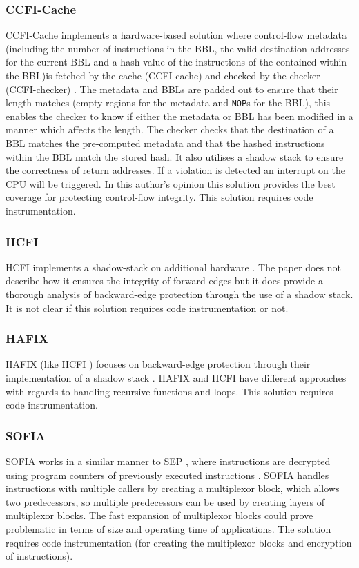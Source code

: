 \subsubsection*{CCFI-Cache}
CCFI-Cache implements a hardware-based solution where control-flow metadata (including the number of instructions in the BBL, the valid destination addresses for the current BBL and a hash value of the instructions of the contained within the BBL)is fetched by the cache (CCFI-cache) and checked by the checker (CCFI-checker) \cite{Danger2018}. The metadata and BBLs are padded out to ensure that their length matches (empty regions for the metadata and \verb|NOP|s for the BBL), this enables the checker to know if either the metadata or BBL has been modified in a manner which affects the length. The checker checks that the destination of a BBL matches the pre-computed metadata and that the hashed instructions within the BBL match the stored hash. It also utilises a shadow stack to ensure the correctness of return addresses. If a violation is detected an interrupt on the CPU will be triggered. In this author's opinion this solution provides the best coverage for protecting control-flow integrity. This solution requires code instrumentation.

\subsubsection*{HCFI}
HCFI implements a shadow-stack on additional hardware \cite{Danger2018}. The paper does not describe how it ensures the integrity of forward edges but it does provide a thorough analysis of backward-edge protection through the use of a shadow stack. It is not clear if this solution requires code instrumentation or not.

\subsubsection*{HAFIX}
HAFIX (like HCFI \cite{Danger2018}) focuses on backward-edge protection through their implementation of a shadow stack \cite{Davi2015}. HAFIX and HCFI have different approaches with regards to handling recursive functions and loops. This solution requires code instrumentation.

\subsubsection*{SOFIA}
SOFIA works in a similar manner to SEP \cite{Lee2019}, where instructions are decrypted using program counters of previously executed instructions \cite{Davi2015}. SOFIA handles instructions with multiple callers by creating a multiplexor block, which allows two predecessors, so multiple predecessors can  be used by creating layers of multiplexor blocks. The fast expansion of multiplexor blocks could prove problematic in terms of size and operating time of applications. The solution requires code instrumentation (for creating the multiplexor blocks and encryption of instructions).

